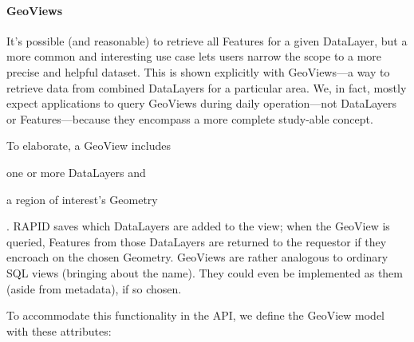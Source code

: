 \paragraph{GeoViews}

It's possible (and reasonable) to retrieve all Features for a given DataLayer, but a more common and interesting use case lets users narrow the scope to a more precise and helpful dataset. This is shown explicitly with GeoViews---a way to retrieve data from combined DataLayers for a particular area. We, in fact, mostly expect applications to query GeoViews during daily operation---not DataLayers or Features---because they encompass a more complete study-able concept.

To elaborate, a GeoView includes 
\begin{enumerate*}[label=\itshape\alph*\upshape)]
\item one or more DataLayers and
\item a region of interest's Geometry
\end{enumerate*}. RAPID saves which DataLayers are added to the view; when the GeoView is queried, Features from those DataLayers are returned to the requestor if they encroach on the chosen Geometry. GeoViews are rather analogous to ordinary SQL views (bringing about the name). They could even be implemented as them (aside from metadata), if so chosen.

To accommodate this functionality in the API, we define the GeoView model with these attributes:

